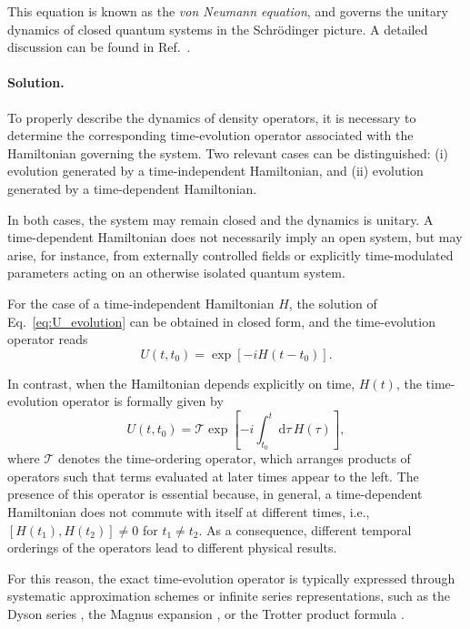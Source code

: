This equation is known as the \textit{von Neumann equation}, and governs the unitary dynamics of closed quantum systems in the Schrödinger picture. A detailed discussion can be found in Ref.~\cite{BreuerPetruccione2006}.

\paragraph{Solution.}
To properly describe the dynamics of density operators, it is necessary to determine the corresponding time-evolution operator associated with the Hamiltonian governing the system.
Two relevant cases can be distinguished:
(i) evolution generated by a time-independent Hamiltonian, and
(ii) evolution generated by a time-dependent Hamiltonian.

In both cases, the system may remain closed and the dynamics is unitary.
A time-dependent Hamiltonian does not necessarily imply an open system, but may arise, for instance, from externally controlled fields or explicitly time-modulated parameters acting on an otherwise isolated quantum system.

For the case of a time-independent Hamiltonian $H$, the solution of Eq.~\eqref{eq:U_evolution} can be obtained in closed form, and the time-evolution operator reads
\begin{equation}
    U(t,t_0) = \exp\!\left[-i H (t - t_0)\right].
\end{equation}

In contrast, when the Hamiltonian depends explicitly on time, $H(t)$, the time-evolution operator is formally given by
\begin{equation}
    U(t,t_0) = \mathcal{T} \exp\!\left[-i \int_{t_0}^{t} \mathrm{d}\tau \, H(\tau)\right],
    \label{eq:time_ordered_exponential}
\end{equation}
where $\mathcal{T}$ denotes the time-ordering operator, which arranges products of operators such that terms evaluated at later times appear to the left.
The presence of this operator is essential because, in general, a time-dependent Hamiltonian does not commute with itself at different times, i.e.,
$[H(t_1), H(t_2)] \neq 0$ for $t_1 \neq t_2$.
As a consequence, different temporal orderings of the operators lead to different physical results.

For this reason, the exact time-evolution operator is typically expressed through systematic approximation schemes or infinite series representations, such as the Dyson series \cite{Sakurai1994}, the Magnus expansion \cite{blanes2009}, or the Trotter product formula \cite{Trotter1959}.

